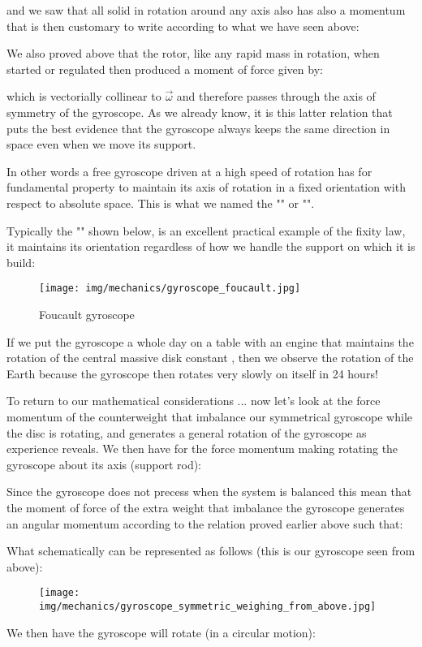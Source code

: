       and we saw that all solid in rotation around any axis also has also a momentum that is then customary to write according to what we have seen above:
     
      We also proved above that the rotor, like any rapid mass  in rotation, when started or regulated then produced a moment of force given by:
     
     which is vectorially collinear to $\vec{\omega}$ and therefore passes through the axis of symmetry of the gyroscope. As we already know, it is this latter relation that puts the best evidence that the gyroscope always keeps the same direction in space even when we move its support.

    In other words a free gyroscope driven at a high speed of rotation has for fundamental property to maintain its axis of rotation in a fixed orientation with respect to absolute space. This is what we named the "" or "".

    Typically the "" shown below, is an excellent practical example of the fixity law, it maintains its orientation regardless of how we handle the support on which it is build:
     \begin{figure}[H]
		\centering
		\texttt{[image: img/mechanics/gyroscope\_foucault.jpg]}
		\caption{Foucault gyroscope}
	\end{figure}
	If we put the gyroscope a whole day on a table with an engine that maintains the rotation of the central massive disk constant , then we observe the rotation of the Earth because the gyroscope then rotates very slowly on itself in 24 hours!

    To return to our mathematical considerations ... now let's look at the force momentum of the counterweight that imbalance our symmetrical gyroscope while the disc is rotating, and generates a general rotation of the gyroscope as experience reveals. We then have for the force momentum making rotating the gyroscope about its axis (support rod):
    
     Since the gyroscope does not precess when the system is balanced this mean that the moment of force of the extra weight that imbalance the gyroscope generates an angular momentum according to the relation proved earlier above such that:
     
     What schematically can be represented as follows (this is our gyroscope seen from above):
     \begin{figure}[H]
		\centering
		\texttt{[image: img/mechanics/gyroscope\_symmetric\_weighing\_from\_above.jpg]}
	\end{figure}
	We then have the gyroscope will rotate (in a circular motion):
     
